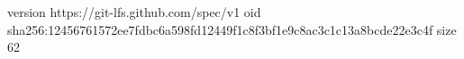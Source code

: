 version https://git-lfs.github.com/spec/v1
oid sha256:12456761572ee7fdbc6a598fd12449f1c8f3bf1e9c8ac3c1c13a8bcde22e3c4f
size 62
